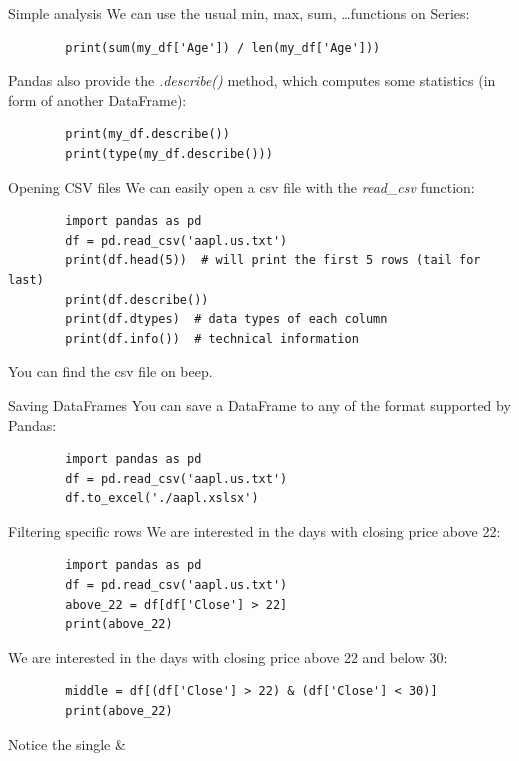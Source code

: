 \documentclass[aspectratio=169,handout]{beamer}
\begin{document}
\begin{frame}[fragile]{Simple analysis}
    We can use the usual min, max, sum, \ldots functions on Series:
    \begin{verbatim}
        print(sum(my_df['Age']) / len(my_df['Age']))
    \end{verbatim}

    Pandas also provide the \emph{.describe()} method, which computes some statistics (in form of another DataFrame):
    \begin{verbatim}
        print(my_df.describe())
        print(type(my_df.describe()))
    \end{verbatim}
\end{frame}

\begin{frame}[fragile]{Opening CSV files}
    We can easily open a csv file with the \emph{read\_csv} function:
    \begin{verbatim}
        import pandas as pd
        df = pd.read_csv('aapl.us.txt')
        print(df.head(5))  # will print the first 5 rows (tail for last)
        print(df.describe())
        print(df.dtypes)  # data types of each column
        print(df.info())  # technical information
    \end{verbatim}

    You can find the csv file on beep.
\end{frame}

\begin{frame}[fragile]{Saving DataFrames}
    You can save a DataFrame to any of the format supported by Pandas:
    \begin{verbatim}
        import pandas as pd
        df = pd.read_csv('aapl.us.txt')
        df.to_excel('./aapl.xslsx')
    \end{verbatim}
\end{frame}

\begin{frame}[fragile]{Filtering specific rows}
    We are interested in the days with closing price above 22:
    \begin{verbatim}
        import pandas as pd
        df = pd.read_csv('aapl.us.txt')
        above_22 = df[df['Close'] > 22]
        print(above_22)
    \end{verbatim}

    We are interested in the days with closing price above 22 and below 30:
    \begin{verbatim}
        middle = df[(df['Close'] > 22) & (df['Close'] < 30)]
        print(above_22)
    \end{verbatim}

    Notice the single \&
\end{frame}
\end{document}
